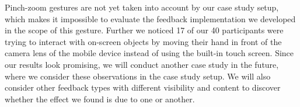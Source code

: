 \documentclass[manuscript]{acmart}
\begin{document}
		Pinch-zoom gestures are not yet taken into account by our case study setup, which makes it impossible to evaluate the feedback implementation we developed in the scope of this gesture. Further we noticed 17 of our 40 participants were trying to interact with on-screen objects by moving their hand in front of the camera lens of the mobile device instead of using the built-in touch screen. Since our results look promising, we will conduct another case study in the future, where we consider these observations in the case study setup. We will also consider other feedback types with different visibility and content to discover whether the effect we found is due to one or another.

	
	
\end{document}
